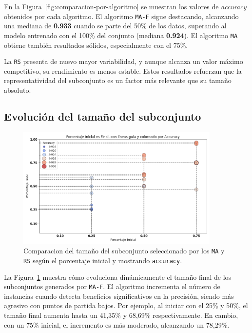 En la Figura~\ref{fig:comparacion-por-algoritmo} se muestran los valores de \textit{accuracy} obtenidos por cada algoritmo.
El algoritmo \texttt{MA-F} sigue destacando, alcanzando una mediana de \textbf{0.933} cuando se parte del 50\% de los datos,
superando al modelo entrenado con el 100\% del conjunto (mediana \textbf{0.924}).
El algoritmo \texttt{MA} obtiene también resultados sólidos, especialmente con el 75\%.

La \texttt{RS} presenta de nuevo mayor variabilidad, y aunque alcanza un valor máximo competitivo, su rendimiento es menos estable.
Estos resultados refuerzan que la representatividad del subconjunto es un factor más relevante que su tamaño absoluto.

\subsection{Evolución del tamaño del subconjunto}

\begin{figure}[htp]
  \centering
  \includegraphics[width=0.9\textwidth]{imagenes/evaluaciones/painting/scatter-por-porcentaje.png}
  \caption{Comparacion del tamaño del subconjunto seleccionado por los \texttt{MA} y \texttt{RS} según el porcentaje inicial y mostrando \texttt{accuracy}.}
  \label{fig:scatter-painting}
\end{figure}

La Figura~\ref{fig:scatter-painting} muestra cómo evoluciona dinámicamente el tamaño final de los subconjuntos generados por \texttt{MA-F}.
El algoritmo incrementa el número de instancias cuando detecta beneficios significativos en la precisión, siendo más agresivo con puntos de partida bajos.
Por ejemplo, al iniciar con el 25\% y 50\%, el tamaño final aumenta hasta un 41,35\% y 68,69\% respectivamente.
En cambio, con un 75\% inicial, el incremento es más moderado, alcanzando un 78,29\%.

